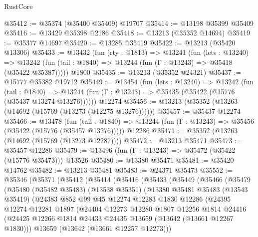 \begin{lexlean}{RustCore}
\begin{coremodule}
@35412 := @35374 (@35400 @35409) @19707
@35414 := @13198 @35399 @35409
@35416 := @13429 @35398 @2186
@35418 := @13213 (@35352 @14694)
@35419 := @35377 @14697
@35420 := @13285 @35419
@35422 := @13213 (@35420 @13306)
@35433 := @13432
    (fun (rty : @1813) =>
    @13241
      (fun (lets : @13240) =>
      @13242 (fun (tail : @1840) => @13244 (fun (Γ : @13243) => @35418 (@35422 @35387)))))
    @1800
@35435 := @13213 (@35352 @24321)
@35437 := @15777 @35382 @19712
@35449 := @13454
    (fun (lets : @13240) =>
    @13242
      (fun (tail : @1840) =>
      @13244 (fun (Γ : @13243) => @35435 (@35422 (@15776 (@35437 @13274 @13276))))))
    @12274
@35456 := @13213 (@35352 (@13263 (@14692 (@15769 (@13273 (@12275 @13276))))))
@35457 := @35437 @12274
@35466 := @13478
    (fun (tail : @1840) => @13244 (fun (Γ : @13243) => @35456 (@35422 (@15776 (@35457 @13276)))))
    @12286
@35471 := @35352 (@13263 (@14692 (@15769 (@13273 @12287))))
@35472 := @13213 @35471
@35473 := @35457 @12286
@35479 := @13496 (fun (Γ : @13243) => @35472 (@35422 (@15776 @35473))) @13526
@35480 := @13380 @35471
@35481 := @35420 @14762
@35482 := @13213 @35481
@35483 := @24371 @35473
@35552 := @35346
    (@35371
      (@35412
        (@35414
          (@35416
            (@35433
              (@35449
                (@35466
                  (@35479
                    (@35480
                      (@35482 @35483)
                      (@13538 @35351)
                      (@13380
                        @35481
                        @35483
                        (@13543 @35419)
                        (@24383
                          @852
                          @99
                          @45
                          @12274
                          @12283
                          @1830
                          @12286
                          (@24395
                            @12274
                            @12281
                            @1897
                            (@24404
                              @12273
                              @12280
                              @1807
                              @12256
                              @1814
                              @24416
                              (@24425
                                @12266
                                @1814
                                @24433
                                @24435
                                @13659
                                (@13642 (@13661 @12267 @1830)))
                              @13659
                              (@13642 (@13661 @12257 @12273)))

\end{coremodule}
\end{lexlean}
